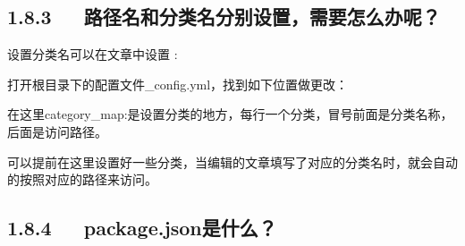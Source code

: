 \documentclass[letterpaper,12pt,english]{sphinxmanual}
\begin{document}
\begin{sphinxVerbatim}[commandchars=\\\{\}]
 
 
 
 
\end{sphinxVerbatim}


\subsection{1.8.3   路径名和分类名分别设置，需要怎么办呢？}
\label{\detokenize{001software/001install/001._u7f51_u7ad9/hexo:id20}}
设置分类名可以在文章中设置 {\hyperref[\detokenize{001software/001install/001._u7f51_u7ad9/hexo:frontmatter-categories}]{}}:

打开根目录下的配置文件\_config.yml，找到如下位置做更改：

\begin{sphinxVerbatim}[commandchars=\\\{\}]
 
     
     
     
\end{sphinxVerbatim}

在这里category\_map:是设置分类的地方，每行一个分类，冒号前面是分类名称，后面是访问路径。

可以提前在这里设置好一些分类，当编辑的文章填写了对应的分类名时，就会自动的按照对应的路径来访问。


\subsection{1.8.4   package.json是什么？}
\label{\detokenize{001software/001install/001._u7f51_u7ad9/hexo:package-json}}

\end{document}
